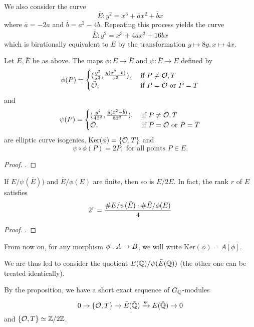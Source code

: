 \documentclass[12pt, a4paper]{amsart}
\begin{document}
We also consider the curve
\[ \bar{E} : y^2 = x^3 + \bar{a}x^2 + \bar{b}x \]
where $\bar{a} = -2a$ and $\bar{b} = a^2 - 4b$. Repeating this process yields
the curve
\[ \bar{\bar{E}} : y^2 = x^3 +  4ax^2 + 16bx\]
which is birationally equivalent to $E$ by the transformation $y \mapsto 8y,
x \mapsto 4x$.

\begin{prop}
  Let $E, \bar{E}$ be as above. The maps $\phi : E \rightarrow \bar{E}$ and
  $\psi : \bar{E} \rightarrow E$ defined by
  \[\phi(P) =
    \begin{cases}
      (\frac{y^2}{x^2}, \frac{y(x^2-b)}{x^2}), & \text{ if } P \neq {\mathcal O}, T \\
      \bar{{\mathcal O}}, & \text{ if } P = {\mathcal O} \text{ or } P = T
    \end{cases}\]
  and
  \[\psi(P) =
    \begin{cases}
      (\frac{\bar{y}^2}{4\bar{x}^2}, \frac{\bar{y}(\bar{x}^2-\bar{b})}{8\bar{x}^2}),
      & \text{ if } P \neq \bar{{\mathcal O}}, \bar{T} \\
      \bar{{\mathcal O}}, & \text{ if } \bar{P} = \bar{{\mathcal O}} \text{ or } \bar{P} = \bar{T}
    \end{cases}\]
  are elliptic curve isogenies, $\text{Ker}(\phi) = \{{\mathcal O}, T\}$ and
  \[ \psi \circ \phi (P) = 2P , \text{ for all points } P \in E.\]
\end{prop}
\begin{proof}
  \cite[See][Chapter 4, page 79]{rational}.
\end{proof}

\begin{lemma} \label{lemma:rankformula}
  If $E / \psi(\bar{E}))$ and $\bar{E} / \phi(E)$ are finite, then so is $E/2E$.
  In fact, the rank $r$ of $E$ satisfies
  \[2^r = \frac{\#E/\psi(\bar{E}) \cdot \#\bar{E}/\phi(E)}{4}\]
\end{lemma}
\begin{proof}
  \cite[See][Chapter 4, page 83]{rational}.
\end{proof}

\begin{defn}
  From now on, for any morphism $\phi : A \rightarrow B$, we
  will write $\text{Ker}(\phi) = A[\phi]$.
\end{defn}

We are thus led to consider the quotient $E({\mathbb Q}) / \psi(\bar{E}({\mathbb Q}))$ (the
other one can be treated identically).

By the proposition, we have a short exact sequence of $G_{{\mathbb Q}}$-modules
\[ 0 \rightarrow \{{\mathcal O}, T\} \rightarrow \bar{E}(\bar{{\mathbb Q}}) \xrightarrow[]{\psi}
  E(\bar{{\mathbb Q}})
  \rightarrow 0\]
and $\{{\mathcal O}, T\} \simeq {\mathbb Z}/2{\mathbb Z}$.
\end{document}
